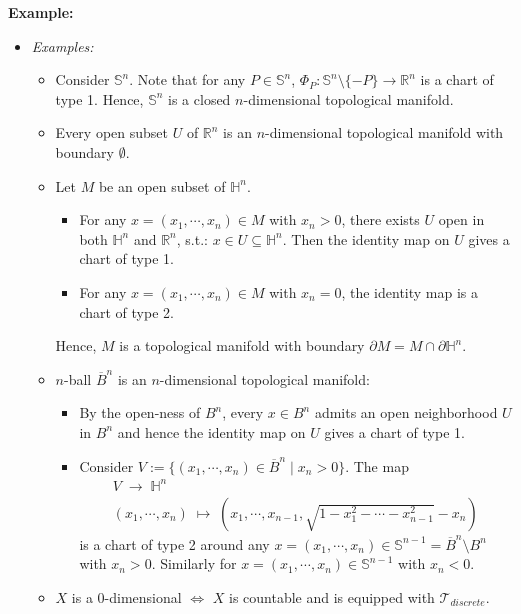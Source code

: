 \noindent\textbf{Example:}
\begin{itemize}
    \item \textit{Examples:}
    \begin{itemize}
        \item Consider $\mathbb{S}^n$. Note that for any $P \in \mathbb{S}^n$, $\Phi_P: \mathbb{S}^n \setminus \{-P\} \to \mathbb{R}^n$ is a chart of type 1. Hence, $\mathbb{S}^n$ is a closed $n$-dimensional topological manifold.

        \item Every open subset $U$ of $\mathbb{R}^n$ is an $n$-dimensional topological manifold with boundary $\emptyset$.

        \item Let $M$ be an open subset of $\mathbb{H}^n$.
        \begin{itemize}
            \item For any $x = (x_1, \cdots, x_n) \in M$ with $x_n>0$, there exists $U$ open in both $\mathbb{H}^n$ and $\mathbb{R}^n$, s.t.: $x \in U \subseteq \mathbb{H}^n$. Then the identity map on $U$ gives a chart of type 1.
            \item For any $x = (x_1, \cdots, x_n) \in M$ with $x_n=0$, the identity map is a chart of type 2.
        \end{itemize}
        Hence, $M$ is a topological manifold with boundary $\partial M = M \cap \partial \mathbb{H}^n$.
        
        \item $n$-ball $\overline{B}^n$ is an $n$-dimensional topological manifold:
        \begin{itemize}
            \item By the open-ness of $B^n$, every $x \in B^n$ admits an open neighborhood $U$ in $B^n$ and hence the identity map on $U$ gives a chart of type 1.
            \item Consider $V:= \{ (x_1,\cdots,x_n) \in \overline{B}^n \mid x_n >0\}$. The map
            $$\substack{V \;\to\; \mathbb{H}^n\\
            (x_1,\cdots,x_n) \;\mapsto\; (x_1,\cdots,x_{n-1},\sqrt{1-x_1^2 - \cdots -x_{n-1}^2}-x_n) }$$
            is a chart of type 2 around any $x= (x_1,\cdots,x_n) \in \mathbb{S}^{n-1} = \overline{B}^n \setminus B^n$ with $x_n >0$. Similarly for $x = (x_1,\cdots,x_n) \in \mathbb{S}^{n-1}$ with $x_n<0$.
        \end{itemize}

        \item $X$ is a $0$-dimensional $\Leftrightarrow$ $X$ is countable and is equipped with $\mathcal{T}_{discrete}$.


\end{itemize}
\end{itemize}
